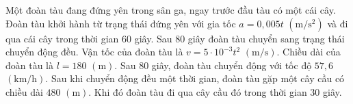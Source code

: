 \begin{ex}
Một đoàn tàu đang đứng yên trong sân ga, ngay trước đầu tàu có một cái cây. Đoàn tàu khởi hành từ trạng thái đứng yên với gia tốc $a=0{,}005t$ $(\mathrm{m/s^2})$ và đi qua cái cây trong thời gian $60$ giây. Sau $80$ giây đoàn tàu chuyển sang trạng thái chuyển động đều.
\choiceTF
{Vận tốc của đoàn tàu là $v=5\cdot10^{-3}t^2$ $(\mathrm{m/s})$.}
{\True Chiều dài của đoàn tàu là $l=180$ $(\mathrm m)$.}
{\True Sau $80$ giây, đoàn tàu chuyển động với tốc độ $57{,}6$ $(\mathrm{km/h})$.}
{Sau khi chuyển động đều một thời gian, đoàn tàu gặp một cây cầu có chiều dài $480$ $(\mathrm m)$. Khi đó đoàn tàu đi qua cây cầu đó trong thời gian $30$ giây.}
\end{ex}
